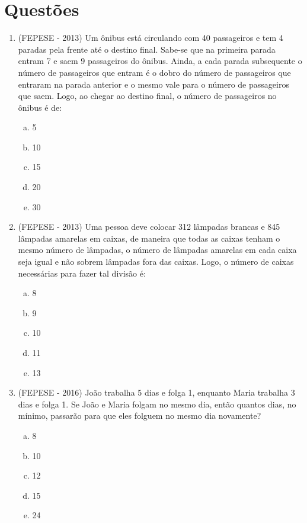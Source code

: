 \section{Questões}
 
 \begin{enumerate}
  \item (FEPESE - 2013) Um ônibus está circulando com 40 passageiros e tem 4 paradas pela frente até o destino final. Sabe-se que na primeira parada entram 7 e saem 9 passageiros do ônibus. Ainda, a cada parada subsequente o número de passageiros que entram é o dobro do número de passageiros que entraram na parada anterior e o mesmo vale para o número de passageiros que saem. Logo, ao chegar ao destino final, o número de passageiros no ônibus é de:
 \begin{enumerate}[a)]
 \item 5
 \item 10
 \item 15
 \item 20
 \item 30
 \end{enumerate}

 
 \item (FEPESE - 2013) Uma pessoa deve colocar 312 lâmpadas brancas e 845 lâmpadas amarelas em caixas, de maneira que todas as caixas tenham o mesmo número de lâmpadas, o número de lâmpadas amarelas em cada caixa seja igual e não sobrem lâmpadas fora das caixas. Logo, o número de caixas necessárias para fazer tal divisão é:
  \begin{enumerate}[a)]
  \item 8
  \item 9
  \item 10
  \item 11
  \item 13
  \end{enumerate}

  
  \item (FEPESE - 2016) João trabalha 5 dias e folga 1, enquanto Maria trabalha 3 dias e folga 1. Se João e Maria folgam no mesmo dia, então quantos dias, no mínimo, passarão para que eles folguem no mesmo dia novamente?
  \begin{enumerate}[a)]
  \item 8
  \item 10
  \item 12
  \item 15
  \item 24
  \end{enumerate}


\end{enumerate}

